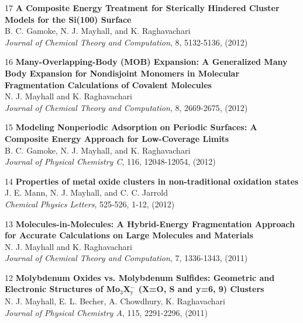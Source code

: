 \documentclass[10pt]{article}
\newenvironment{lonelist}[1][\enskip\textbullet]%
        {\vspace{-\baselineskip}\begin{list}{#1}{%
        \setlength{\partopsep}{0pt}%
        \setlength{\topsep}{0pt}}}
        {\end{list}\vspace{-.6\baselineskip}}
\begin{document}
\begin{lonelist}
\item[17\hspace{4pt}] \textbf{A Composite Energy Treatment for Sterically Hindered Cluster Models for the Si(100) Surface}\\
B. C. Gamoke, N. J. Mayhall, and K. Raghavachari \\
\textsl{Journal of Chemical Theory and Computation}, 8, 5132-5136, (2012)

\item [16\hspace{4pt}]
\textbf{Many-Overlapping-Body (MOB) Expansion: A Generalized Many Body Expansion for Nondisjoint Monomers in Molecular Fragmentation Calculations of Covalent Molecules} \\
N. J. Mayhall and K. Raghavachari \\
\textsl{Journal of Chemical Theory and Computation}, 8, 2669-2675, (2012)

\item[15\hspace{4pt}] \textbf{Modeling Nonperiodic Adsorption on Periodic Surfaces: A Composite Energy Approach for Low-Coverage Limits}\\
B. C. Gamoke, N. J. Mayhall, and K. Raghavachari \\
\textsl{Journal of Physical Chemistry C}, 116, 12048-12054, (2012)

\item[14\hspace{4pt}] \textbf{Properties of metal oxide clusters in non-traditional oxidation states}\\
J. E. Mann, N. J. Mayhall, and C. C. Jarrold\\
 \textsl{Chemical Physics Letters}, 525-526, 1-12, (2012)

\item[13\hspace{4pt}] \textbf{Molecules-in-Molecules: A Hybrid-Energy Fragmentation Approach for Accurate Calculations on Large Molecules and Materials}\\
N. J. Mayhall and K. Raghavachari\\
\textsl{Journal of Chemical Theory and Computation}, 7, 1336-1343, (2011)

\item[12\hspace{4pt}] \textbf{Molybdenum Oxides vs. Molybdenum Sulfides: Geometric and Electronic Structures of Mo$_3$X$_\text{y}^−$ (X=O, S and y=6, 9) Clusters}\\
N. J. Mayhall, E. L. Becher, A. Chowdhury, K. Raghavachari\\
\textsl{Journal of Physical Chemistry A}, 115, 2291-2296, (2011)


\end{lonelist}
\end{document}
